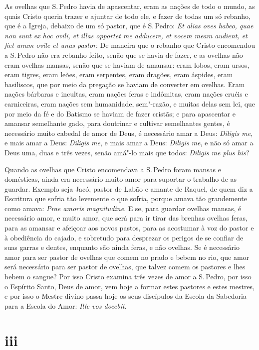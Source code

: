As ovelhas que S.\,Pedro havia de apascentar, eram as nações de todo o
mundo, as quais Cristo queria trazer e ajuntar de todo ele, e fazer de
todas um só rebanho, que é a Igreja, debaixo de um só pastor, que é S.\,Pedro: \emph{Et alias oves habeo, quae non sunt ex hoc ovili, et illas
opportet me adducere, et vocem meam audient, et fiet unum ovile et unus
pastor}. De maneira que o rebanho que Cristo encomendou a S.\,Pedro não
era rebanho feito, senão que se havia de fazer, e as ovelhas não eram
ovelhas mansas, senão que se haviam de amansar: eram lobos, eram ursos,
eram tigres, eram leões, eram serpentes, eram dragões, eram áspides,
eram basiliscos, que por meio da pregação se haviam de converter em
ovelhas. Eram nações bárbaras e incultas, eram nações feras e indômitas,
eram nações cruéis e carniceiras, eram nações sem humanidade, sem"-razão,
e muitas delas sem lei, que por meio da fé e do Batismo se haviam de
fazer cristãs; e para apascentar e amansar semelhante gado, para
doutrinar e cultivar semelhantes gentes, é necessário muito cabedal de
amor de Deus, é necessário amar a Deus: \emph{Diligis me}, e mais amar a
Deus: \emph{Diligis me}, e mais amar a Deus: \emph{Diligis me}, e não só
amar a Deus uma, duas e três vezes, senão amá"-lo mais que todos:
\emph{Diligis me plus his}?

Quando as ovelhas que Cristo encomendava a S.\,Pedro foram mansas e
domésticas, ainda era necessário muito amor para suportar o trabalho de
as guardar. Exemplo seja Jacó, pastor de Labão e amante de Raquel, de
quem diz a Escritura que sofria tão levemente o que sofria, porque amava
tão grandemente como amava: \emph{Prae amoris magnitudine}. %
E se, para guardar ovelhas mansas, é necessário amor, e muito amor,
que será para ir tirar das brenhas ovelhas feras, para as amansar e
afeiçoar aos novos pastos, para as acostumar à voz do pastor e à
obediência do cajado, e sobretudo para desprezar os perigos de se
confiar de suas garras e dentes, enquanto são ainda feras, e não
ovelhas.
Se é necessário amor para ser pastor de ovelhas que comem no prado e
bebem no rio, que amor será necessário para ser pastor de ovelhas, que
talvez comem os pastores e lhes bebem o sangue? Por isso Cristo examina
três vezes de amor a S.\,Pedro, por isso o Espírito Santo, Deus de amor,
vem hoje a formar estes pastores e estes mestres, e por isso o Mestre
divino passa hoje os seus discípulos da Escola da Sabedoria para a
Escola do Amor: \emph{Ille vos docebit}.

\section{iii}


